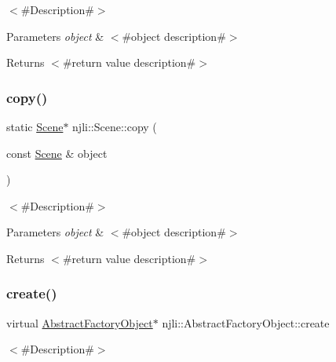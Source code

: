 $<$\#\+Description\#$>$


\begin{DoxyParams}{Parameters}
{\em object} & $<$\#object description\#$>$\\
\hline
\end{DoxyParams}
\begin{DoxyReturn}{Returns}
$<$\#return value description\#$>$ 
\end{DoxyReturn}
\mbox{\label{classnjli_1_1_scene_a7f779488f52836cea51f1a38488f876b}} 
\subsubsection{\texorpdfstring{copy()}{copy()}}
{\footnotesize\ttfamily static \mbox{\hyperlink{classnjli_1_1_scene}{Scene}}$\ast$ njli\+::\+Scene\+::copy (\begin{DoxyParamCaption}\item[{const \mbox{\hyperlink{classnjli_1_1_scene}{Scene}} \&}]{object }\end{DoxyParamCaption})\hspace{0.3cm}{\ttfamily [static]}}

$<$\#\+Description\#$>$


\begin{DoxyParams}{Parameters}
{\em object} & $<$\#object description\#$>$\\
\hline
\end{DoxyParams}
\begin{DoxyReturn}{Returns}
$<$\#return value description\#$>$ 
\end{DoxyReturn}
\mbox{\label{classnjli_1_1_scene_a83a8876ae63b92804004cf3febe76573}} 
\subsubsection{\texorpdfstring{create()}{create()}\hspace{0.1cm}{\footnotesize\ttfamily [1/3]}}
{\footnotesize\ttfamily virtual \mbox{\hyperlink{classnjli_1_1_abstract_factory_object}{Abstract\+Factory\+Object}}$\ast$ njli\+::\+Abstract\+Factory\+Object\+::create}

$<$\#\+Description\#$>$


